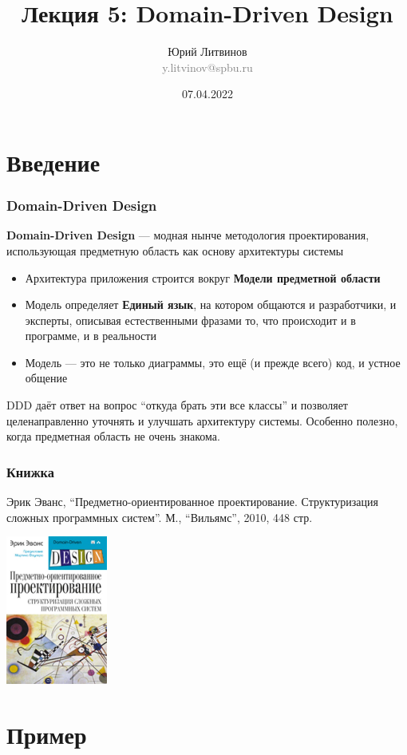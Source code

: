 \documentclass[xetex,mathserif,serif]{beamer}
\title{Лекция 5: Domain-Driven Design}
\author[Юрий Литвинов]{Юрий Литвинов\\\small{\textcolor{gray}{y.litvinov@spbu.ru}}}
\date{07.04.2022}
\begin{document}
    
    \frame{\titlepage}

    \section{Введение}

    \begin{frame}
        \frametitle{Domain-Driven Design}
        \textbf{Domain-Driven Design} --- модная нынче методология проектирования, использующая предметную область как основу архитектуры системы
        \begin{itemize}
            \item Архитектура приложения строится вокруг \textbf{Модели предметной области}
            \item Модель определяет \textbf{Единый язык}, на котором общаются и разработчики, и эксперты, описывая естественными фразами то, что происходит и в программе, и в реальности
            \item Модель --- это не только диаграммы, это ещё (и прежде всего) код, и устное общение
        \end{itemize}
        DDD даёт ответ на вопрос ``откуда брать эти все классы'' и позволяет целенаправленно уточнять и улучшать архитектуру системы. 
        Особенно полезно, когда предметная область не очень знакома.
    \end{frame}

    \begin{frame}
        \frametitle{Книжка}
        Эрик Эванс, ``Предметно-ориентированное проектирование. Структуризация сложных программных систем''. М., ``Вильямс'', 2010, 448 стр.
        \begin{center}
            \includegraphics[width=0.25\textwidth]{dddCover.jpg}
        \end{center}
    \end{frame}

    \section{Пример}
\end{document}
